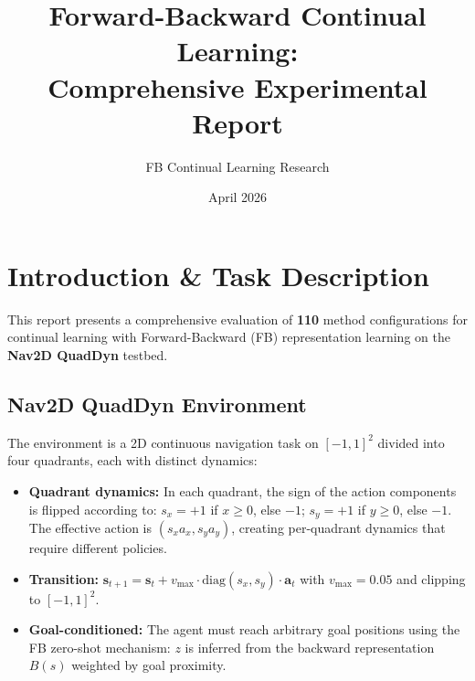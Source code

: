 \documentclass[11pt,a4paper]{article}
\title{Forward-Backward Continual Learning:\\Comprehensive Experimental Report}
\author{FB Continual Learning Research}
\date{April 2026}
\begin{document}
\maketitle
\tableofcontents
\newpage

\section{Introduction \& Task Description}

This report presents a comprehensive evaluation of \textbf{110} method configurations
for continual learning with Forward-Backward (FB) representation learning on the
\textbf{Nav2D QuadDyn} testbed.

\subsection{Nav2D QuadDyn Environment}
The environment is a 2D continuous navigation task on $[-1,1]^2$ divided into four quadrants,
each with distinct dynamics:
\begin{itemize}
    \item \textbf{Quadrant dynamics:} In each quadrant, the sign of the action components is flipped
    according to: $s_x = +1$ if $x \geq 0$, else $-1$; $s_y = +1$ if $y \geq 0$, else $-1$.
    The effective action is $(s_x a_x, s_y a_y)$, creating per-quadrant dynamics
    that require different policies.
    \item \textbf{Transition:} $\mathbf{s}_{t+1} = \mathbf{s}_t + v_{\max} \cdot \text{diag}(s_x, s_y) \cdot \mathbf{a}_t$
    with $v_{\max} = 0.05$ and clipping to $[-1,1]^2$.
    \item \textbf{Goal-conditioned:} The agent must reach arbitrary goal positions using
    the FB zero-shot mechanism: $z$ is inferred from the backward representation $B(s)$
    weighted by goal proximity.
\end{itemize}
\end{document}
